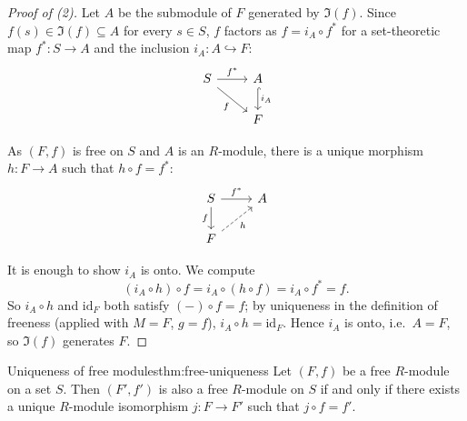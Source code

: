 \begin{proof}[Proof of (2)]
Let $A$ be the submodule of $F$ generated by $\Im(f)$. Since $f(s) \in \Im(f) \subseteq A$ for every $s \in S$, $f$ factors as $f = i_A \circ f^*$ for a set-theoretic map $f^*: S \to A$ and the inclusion $i_A: A \hookrightarrow F$:
\[
\begin{tikzcd}
S \arrow[r, "f^*"] \arrow[dr, "f"'] & A \arrow[d, hook, "i_A"] \\
& F
\end{tikzcd}
\]

As $(F, f)$ is free on $S$ and $A$ is an $R$-module, there is a unique morphism $h: F \to A$ such that $h \circ f = f^*$:
\[
\begin{tikzcd}
S \arrow[r, "f^*"] \arrow[d, "f"'] & A \\
F \arrow[ur, dashed, "h"'] &
\end{tikzcd}
\]

It is enough to show $i_A$ is onto. We compute
\[
(i_A \circ h) \circ f = i_A \circ (h \circ f) = i_A \circ f^* = f.
\]
So $i_A \circ h$ and $\mathrm{id}_F$ both satisfy $(-) \circ f = f$; by uniqueness in the definition of freeness (applied with $M = F$, $g = f$), $i_A \circ h = \mathrm{id}_F$. Hence $i_A$ is onto, i.e.\ $A = F$, so $\Im(f)$ generates $F$.
\end{proof}

\begin{theorem}{Uniqueness of free modules}{thm:free-uniqueness}
Let $(F, f)$ be a free $R$-module on a set $S$. Then $(F', f')$ is also a free $R$-module on $S$ if and only if there exists a unique $R$-module isomorphism $j: F \to F'$ such that $j \circ f = f'$.
\end{theorem}

